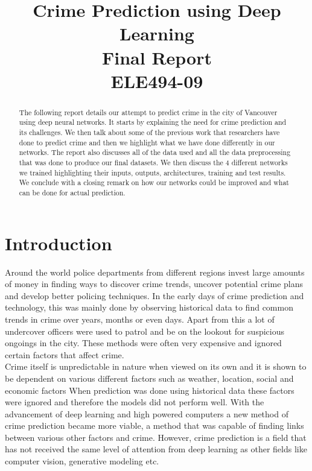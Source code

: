 \documentclass[conference]{IEEEtran}
\begin{document}
\title{Crime Prediction using Deep Learning\\[0.3cm]
\large Final Report\\
ELE494-09}


\author{
\and
{}
}

\maketitle

\begin{abstract}
The following report details our attempt to predict crime in the city of Vancouver using deep
neural networks. It starts by explaining the need for crime prediction and its challenges. We then talk about some of the previous work that researchers have done to predict crime
and then we highlight what we have done differently in our networks. The report also discusses all of the
data used and all the data preprocessing that was done to produce our final datasets. We then discuss the
4 different networks we trained highlighting their inputs, outputs, architectures, training and test results.
We conclude with a closing remark on how our networks could be improved and what can be done for actual prediction.
\end{abstract}

\IEEEpeerreviewmaketitle


\section{Introduction}

Around the world police departments from different regions invest large amounts
of money in finding ways to discover crime trends, uncover potential crime plans and
develop better policing techniques. In the early days of crime prediction and technology,
this was mainly done by observing historical data to find common trends in crime over years,
months or even days. Apart from this a lot of undercover officers were used to patrol and be on
the lookout for suspicious ongoings in the city. These methods were often very expensive and ignored
certain factors that affect crime.\\

Crime itself is unpredictable in nature when viewed on its own and it is shown to be dependent
on various different factors such as weather, location, social and economic factors \cite{Carlen}
When prediction was done using historical data these factors were ignored and therefore the models
did not perform well. With the advancement of deep learning and high powered computers a new method of
crime prediction became more viable, a method that was capable of finding links between various other factors and crime.
However, crime prediction is a field that has not received the same level of attention from deep learning as other fields
like computer vision, generative modeling etc.\\
\end{document}
